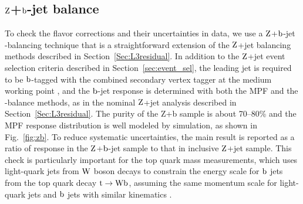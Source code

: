 \documentclass[11pt,twoside,a4paper,cmspaper,final,collab]{cms-tdr}
\begin{document}
\subsection{\texorpdfstring{$\mathrm{Z}$+$\mathrm{b}$-jet}{Z+b-jet} balance}
\label{sec:Zb}

To check the flavor corrections and their uncertainties in data, we use a $\mathrm{Z}$+$\mathrm{b}$-jet \pt-balancing technique \cite{CMS-PAS-JME-13-001} that is a straightforward extension of the $\mathrm{Z}$+jet balancing methods described in Section~\ref{Sec:L3residual}. In addition to the $\mathrm{Z}$+jet event selection criteria described in Section~\ref{sec:event_sel}, the leading jet is required to be $\mathrm{b}$-tagged with the combined secondary vertex tagger at the medium working point \cite{btag}, and the $\mathrm{b}$-jet response is determined with both the MPF and the \pt-balance methods, as in the nominal $\mathrm{Z}$+jet analysis described in Section~\ref{Sec:L3residual}. The purity of the Z+b sample is about 70--80\% and the MPF response distribution is well modeled by simulation, as shown in Fig.~\ref{fig:zb}. To reduce systematic uncertainties, the main result is reported as a ratio of response in the $\mathrm{Z}$+$\mathrm{b}$-jet sample to that in inclusive $\mathrm{Z}$+jet sample.
This check is particularly important for the top quark mass measurements, which uses light-quark jets from $\mathrm{W}$ boson decays to constrain the energy scale for $\mathrm{b}$ jets from the top quark decay $\mathrm{t} \to \mathrm{W} \mathrm{b}$, assuming the same momentum scale for light-quark jets and $\mathrm{b}$ jets with similar kinematics \cite{Chatrchyan:2013xza}.
\end{document}
